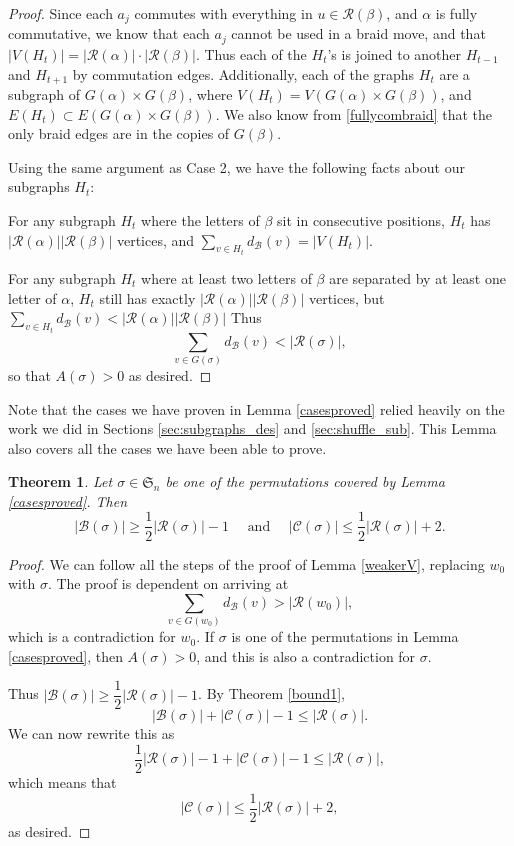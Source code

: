 \documentclass[11pt,reqno]{amsart}
\newtheorem{theorem}{Theorem}[section]
\theoremstyle{definition}
\theoremstyle{notation}
\newcommand{\calR}{\mathcal{R}}
\newcommand{\calB}{\mathcal{B}}
\newcommand{\calC}{\mathcal{C}}
\begin{document}
\begin{proof}
Since each $a_j$ commutes with everything in $u\in \calR(\beta)$, and $\alpha$ is fully commutative, we know that each $a_j$ cannot be used in a braid move, and that $|V(H_t)| = |\calR(\alpha)|\cdot|\calR(\beta)|$. Thus each of the $H_t$'s is joined to another $H_{t-1}$ and $H_{t+1}$ by commutation edges. Additionally, each of the graphs $H_t$ are a subgraph of $G(\alpha)\times G(\beta)$, where $V(H_t) = V(G(\alpha)\times G(\beta))$, and $E(H_t)\subset E(G(\alpha)\times G(\beta))$. We also know from \ref{fullycombraid} that the only braid edges are in the copies of $G(\beta)$.

Using the same argument as Case 2, we have the following facts about our subgraphs $H_t$: 

For any subgraph $H_t$ where the letters of $\beta$ sit in consecutive positions, $H_t$ has $|\calR(\alpha)||\calR(\beta)|$ vertices, and $\sum_{v\in H_t}d_\calB(v) = |V(H_t)|$. 

For any subgraph $H_t$ where at least two letters of $\beta$ are separated by at least one letter of $\alpha$, $H_t$ still has exactly $|\calR(\alpha)||\calR(\beta)|$ vertices, but $ \sum_{v\in H_t} d_\calB(v)  <|\calR(\alpha)||\calR(\beta)|$
Thus 
\[
\sum_{v\in G(\sigma)} d_\calB(v) < |\calR(\sigma)|,
\]
so that $A(\sigma)>0$ as desired.
\end{proof}

Note that the cases we have proven in Lemma \ref{casesproved} relied heavily on the work we did in Sections \ref{sec:subgraphs_des} and \ref{sec:shuffle_sub}. This Lemma also covers all the cases we have been able to prove. 





\begin{theorem}\label{mainresult}
Let $\sigma \in \mathfrak{S}_n$ be one of the permutations covered by Lemma \ref{casesproved}. Then 
\[|\calB(\sigma)| \geq \dfrac{1}{2}|\calR(\sigma)|-1 \quad \mbox{ and } \quad |\calC(\sigma)| \leq \dfrac{1}{2}|\calR(\sigma)| +2.
\]
\end{theorem}

\begin{proof}
We can follow all the steps of the proof of Lemma \ref{weakerV}, replacing $w_0$ with $\sigma$. The proof is dependent on arriving at 
\[
\sum_{v\in G(w_0)} d_\calB(v) > |\calR(w_0)|,
\]
which is a contradiction for $w_0$. If $\sigma$ is one of the permutations in Lemma \ref{casesproved}, then $A(\sigma)>0$, and this is also a contradiction for $\sigma$. 

Thus $|\calB(\sigma)| \geq \dfrac{1}{2} |\calR(\sigma)| -1$. By Theorem \ref{bound1}, 
\[
|\calB(\sigma)|+|\calC(\sigma)|-1 \leq |\calR(\sigma)|.
\]
We can now rewrite this as 
\[
\dfrac{1}{2}|\calR(\sigma)|-1+|\calC(\sigma)|-1 \leq |\calR(\sigma)|,
\]
which means that
\[
|\calC(\sigma)| \leq \dfrac{1}{2}|\calR(\sigma)| +2,
\]
as desired.
\end{proof}
\end{document}
